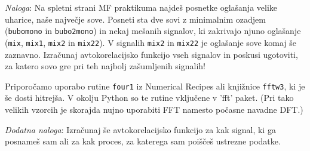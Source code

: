 \documentclass[slovene,11pt,a4paper]{article}
\begin{document}
\bigskip

{\it Naloga\/}: Na spletni strani MF praktikuma najdeš posnetke
oglašanja velike uharice, naše največje sove.  Posneti sta
dve sovi z minimalnim ozadjem ({\tt bubomono} in {\tt bubo2mono})
in nekaj mešanih signalov, ki zakrivajo njuno oglašanje
({\tt mix}, {\tt mix1}, {\tt mix2} in {\tt mix22}).
V signalih {\tt mix2} in {\tt mix22} je oglašanje sove
komaj še zaznavno.  Izračunaj avtokorelacijsko funkcijo 
vseh signalov in poskusi ugotoviti, za katero sovo gre
pri teh najbolj zašumljenih signalih!

Priporočamo uporabo rutine {\tt four1\/} iz Numerical Recipes
ali knjižnice {\tt fftw3}, ki je še dosti hitrejša. V okolju Python
so te rutine vključene v 'fft' paket. 
(Pri tako velikih vzorcih je skorajda nujno uporabiti FFT
namesto počasne navadne DFT.)

\bigskip

{\it Dodatna naloga\/}: Izračunaj še avtokorelacijsko funkcijo
za kak signal, ki ga posnameš sam ali za kak proces, za katerega
sam poiščeš ustrezne podatke.
\end{document}
